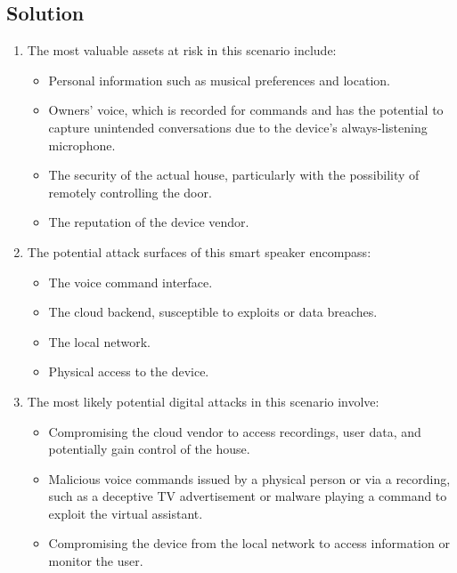 \subsection{Solution}
\begin{enumerate}
    \item The most valuable assets at risk in this scenario include:
        \begin{itemize}
            \item Personal information such as musical preferences and location.
            \item Owners' voice, which is recorded for commands and has the potential to capture unintended conversations due to the device's always-listening microphone.
            \item The security of the actual house, particularly with the possibility of remotely controlling the door.
            \item The reputation of the device vendor.
        \end{itemize}
    \item The potential attack surfaces of this smart speaker encompass:
        \begin{itemize}
            \item The voice command interface.
            \item The cloud backend, susceptible to exploits or data breaches.
            \item The local network.
            \item Physical access to the device.
        \end{itemize}
    \item The most likely potential digital attacks in this scenario involve:
        \begin{itemize}
            \item Compromising the cloud vendor to access recordings, user data, and potentially gain control of the house.
            \item Malicious voice commands issued by a physical person or via a recording, such as a deceptive TV advertisement or malware playing a command to exploit the virtual assistant.
            \item Compromising the device from the local network to access information or monitor the user.
        \end{itemize}
\end{enumerate}
